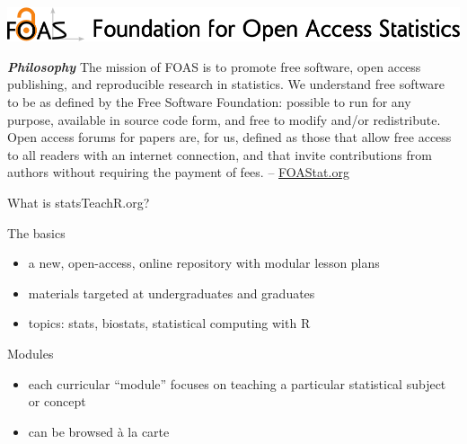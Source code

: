 
\begin{frame}

\includegraphics[width=\linewidth]{FOASLogo.png}


{\footnotesize {\bf \em Philosophy} The mission of FOAS is to promote free software, open access publishing, and reproducible research in statistics. We understand free software to be as defined by the Free Software Foundation: possible to run for any purpose, available in source code form, and free to modify and/or redistribute. Open access forums for papers are, for us, defined as those that allow free access to all readers with an internet connection, and that invite contributions from authors without requiring the payment of fees. -- \href{http://www.foastat.org}{FOAStat.org}

}

\end{frame}





\begin{frame}{What is statsTeachR.org?}

\begin{block}{The basics}
\begin{itemize}
        \item a new, open-access, online repository with modular lesson plans
        \item materials targeted at undergraduates and graduates 
        \item topics: stats, biostats, statistical computing with R
\end{itemize}
\end{block}

\begin{block}{Modules}
\begin{itemize}
        \item each curricular ``module'' focuses on teaching a particular statistical subject or concept
        \item can be browsed \`a la carte
\end{itemize}
\end{block}

\end{frame}

